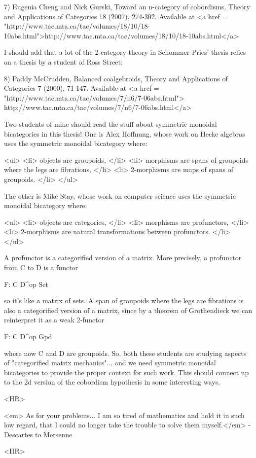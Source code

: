 7) Eugenia Cheng and Nick Gurski, Toward an n-category of cobordisms,
Theory and Applications of Categories 18 (2007), 274-302.  Available at
<a href = "http://www.tac.mta.ca/tac/volumes/18/10/18-10abs.html">http://www.tac.mta.ca/tac/volumes/18/10/18-10abs.html</a>

I should add that a lot of the 2-category theory in Schommer-Pries'
thesis relies on a thesis by a student of Ross Street:

8) Paddy McCrudden, Balanced coalgebroids, Theory and Applications of
Categories 7 (2000), 71-147.  Available at
<a href = "http://www.tac.mta.ca/tac/volumes/7/n6/7-06abs.html">
http://www.tac.mta.ca/tac/volumes/7/n6/7-06abs.html</a>

Two students of mine should read the stuff about symmetric monoidal
bicategories in this thesis!  One is Alex Hoffnung, whose work on
Hecke algebras uses the symmetric monoidal bicategory where:

<ul>
<li>
objects are groupoids,
</li>
<li>
morphisms are spans of groupoids where the legs are fibrations,
</li>
<li>
2-morphisms are maps of spans of groupoids.
</li>
</ul>

The other is Mike Stay, whose work on computer science uses
the symmetric monoidal bicategory where:

<ul>
<li>
objects are categories,
</li>
<li> 
morphisms are profunctors,
</li>
<li>
2-morphisms are natural transformations between profunctors.
</li>
</ul>

A profunctor is a categorified version of a matrix.  More precisely,
a profunctor from C to D is a functor

F: C \times  D^{op} \to  Set

so it's like a matrix of sets.  A span of groupoids where the
legs are fibrations is also a categorified version of a matrix,
since by a theorem of Grothendieck we can reinterpret it as a
weak 2-functor

F: C \times  D^{op} \to  Gpd

where now C and D are groupoids.  So, both these students are
studying aspects of "categorified matrix mechanics"... and we
need symmetric monoidal bicategories to provide the proper context
for such work.  This should connect up to the 2d version of the
cobordism hypothesis in some interesting ways.

<HR>

<em>
As for your problems... I am so tired of mathematics and hold it
in such low regard, that I could no longer take the trouble to solve
them myself.</em> - Descartes to Mersenne

<HR>




